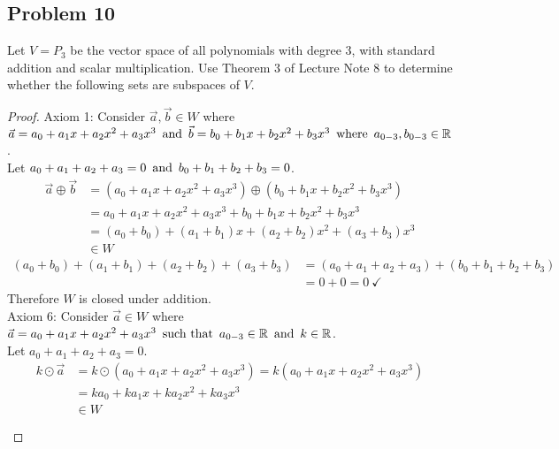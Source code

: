 \documentclass{article}
\begin{document}
\subsection*{Problem 10}
Let $V = P_3$ be the vector space of all polynomials with degree  3, with standard addition and scalar multiplication. Use Theorem 3 of Lecture Note 8 to determine whether the following sets are subspaces of $V$.
\begin{enumerate}
    \begin{proof}
        Axiom 1: Consider $\vec{a},\vec{b} \in W$ where $\vec{a} = a_0+a_1x+a_2x^2+a_3x^3 \operatorname{~\text{and}~} \vec{b} = b_0+b_1x+b_2x^2+b_3x^3 \operatorname{~\text{where}~} a_{0-3}, b_{0-3} \in \mathbb{R}$. \\
        Let $a_0+a_1+a_2+a_3=0 \operatorname{~\text{and}~} b_0+b_1+b_2+b_3=0$.
        \begin{align*}
            \vec{a} \oplus \vec{b} & = (a_0+a_1x+a_2x^2+a_3x^3) \oplus (b_0+b_1x+b_2x^2+b_3x^3) \\
                                   & = a_0+a_1x+a_2x^2+a_3x^3 + b_0+b_1x+b_2x^2+b_3x^3          \\
                                   & = (a_0+b_0) + (a_1+b_1)x + (a_2+b_2)x^2 + (a_3+b_3)x^3     \\
                                   & \in W
        \end{align*}
        \begin{align*}
            (a_0+b_0) + (a_1+b_1) + (a_2+b_2) + (a_3+b_3) & = (a_0 + a_1 + a_2 + a_3) + (b_0 + b_1 + b_2 + b_3) \\
                                                          & = 0 + 0 = 0~\checkmark
        \end{align*}
        Therefore $W$ is closed under addition. \\
        Axiom 6: Consider $\vec{a} \in W$ where $\vec{a} = a_0+a_1x+a_2x^2+a_3x^3 \operatorname{~\text{such that}~} a_{0-3} \in \mathbb{R} \operatorname{~\text{and}~} k \in \mathbb{R}$. \\
        Let $a_0+a_1+a_2+a_3=0$.
        \begin{align*}
            k \odot \vec{a} & = k \odot (a_0+a_1x+a_2x^2+a_3x^3) = k(a_0+a_1x+a_2x^2+a_3x^3)           \\
                            & = ka_0+ka_1x+ka_2x^2+ka_3x^3                                             \\
                            & \in W                                                                    \\ \\

\end{align*}
\end{proof}
\end{enumerate}
\end{document}
